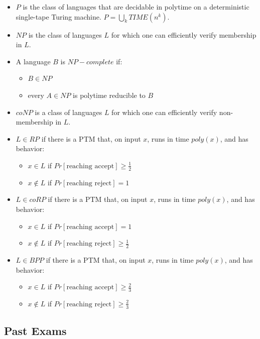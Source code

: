 \documentclass[10pt,landscape,a4paper]{article}
\begin{document}
\begin{multicols*}{3}
\begin{itemize}
    \item $P$ is the class of languages that are decidable in polytime on a deterministic single-tape Turing machine. $P = \bigcup\limits_{k} TIME(n^k)$.
    \item $NP$ is the class of languages $L$ for which one can efficiently verify membership in $L$.
    \item A language $B$ is $NP-complete$ if:
    \begin{itemize}
        \item $B \in NP$
        \item every $A \in NP$ is polytime reducible to $B$
    \end{itemize}
    \item $coNP$ is a class of languages $L$ for which one can efficiently verify non-membership in $L$.
    \item $L \in RP$ if there is a PTM that, on input $x$, runs in time $poly(x)$, and has behavior:
    \begin{itemize}
        \item $x \in L$ if $Pr[\text{reaching accept}] \geq \frac{1}{2}$
        \item $x \notin L$ if $Pr[\text{reaching reject}] = 1$
    \end{itemize}
    \item $L \in coRP$ if there is a PTM that, on input $x$, runs in time $poly(x)$, and has behavior:
    \begin{itemize}
        \item $x \in L$ if $Pr[\text{reaching accept}] = 1$
        \item $x \notin L$ if $Pr[\text{reaching reject}] \geq \frac{1}{2}$
    \end{itemize}
    \item $L \in BPP$ if there is a PTM that, on input $x$, runs in time $poly(x)$, and has behavior:
    \begin{itemize}
        \item $x \in L$ if $Pr[\text{reaching accept}] \geq \frac{2}{3}$
        \item $x \notin L$ if $Pr[\text{reaching reject}] \geq \frac{2}{3}$
    \end{itemize}
\end{itemize}

\subsection{Past Exams}


\end{multicols*}
\end{document}
